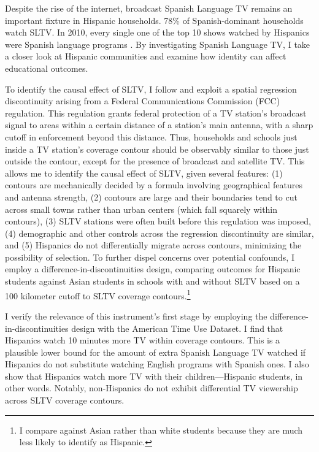 \documentclass[11pt]{article}
\begin{document}
Despite the rise of the internet, broadcast Spanish Language TV remains an important fixture in Hispanic households. 78\% of Spanish-dominant households watch SLTV. In 2010, every single one of the top 10 shows watched by Hispanics were Spanish language programs \citep{pardo_three_2011}. By investigating Spanish Language TV, I take a closer look at Hispanic communities and examine how identity can affect educational outcomes. %

To identify the causal effect of SLTV, I follow \cite{velez_tuning_2019} and exploit a spatial regression discontinuity arising from a Federal Communications Commission (FCC) regulation. This regulation grants federal protection of a TV station’s broadcast signal to areas within a certain distance of a station’s main antenna, with a sharp cutoff in enforcement beyond this distance. Thus, households and schools just inside a TV station's coverage contour should be observably similar to those just outside the contour, except for the presence of broadcast and satellite TV. This allows me to identify the causal effect of SLTV, given several features: (1) contours are mechanically decided by a formula involving geographical features and antenna strength, (2) contours are large and their boundaries tend to cut across small towns rather than urban centers (which fall squarely within contours), (3) SLTV stations were often built before this regulation was imposed, (4) demographic and other controls across the regression discontinuity are similar, and (5) Hispanics do not differentially migrate across contours, minimizing the possibility of selection. To further dispel concerns over potential confounds, I employ a difference-in-discontinuities design, comparing outcomes for Hispanic students against Asian students in schools with and without SLTV based on a 100 kilometer cutoff to SLTV coverage contours.\footnote{I compare against Asian rather than white students because they are much less likely to identify as Hispanic.} 

I verify the relevance of this instrument's first stage by employing the difference-in-discontinuities design with the American Time Use Dataset. I find that Hispanics watch 10 minutes more TV within coverage contours. This is a plausible lower bound for the amount of extra Spanish Language TV watched if Hispanics do not substitute watching English programs with Spanish ones. I also show that Hispanics watch more TV with their children---Hispanic students, in other words. Notably, non-Hispanics do not exhibit differential TV viewership across SLTV coverage contours.
	
\end{document}
